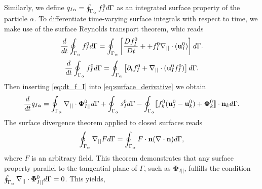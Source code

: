 Similarly, we define $q_{I\alpha} = \oint_{\Gamma_{\alpha}}  f_I^0 d\Gamma$ as an integrated surface property of the particle $\alpha$.
To differentiate time-varying surface integrals with respect to time, we make use of the surface Reynolds transport theorem, whic reads \citep{nadim1996concise} %
\begin{equation}
    \frac{d}{dt}  \oint_{\Gamma_{\alpha}} f_I^0  d\Gamma
    = \oint_{\Gamma_{\alpha}}  \left[
        \frac{D f_I^0}{Dt}+
        +   f_I^0\mathbf{\nabla}_{||} \cdot (\textbf{u}_I^0)
    \right] d\Gamma.
    \label{eq:surface_derivative}
\end{equation}
\begin{equation}
    \frac{d}{dt}  \oint_{\Gamma_{\alpha}} f_I^0  d\Gamma
    = \oint_{\Gamma_{\alpha}}  \left[
        \partial_t f_I^0
        +   \mathbf{\nabla}_{||} \cdot (\textbf{u}_I^0f_I^0)
    \right] d\Gamma.
    \label{eq:surface_derivative}
\end{equation}
Then inserting \ref{eq:dt_f_I} into \ref{eq:surface_derivative} we obtain
\begin{equation}
    \frac{d}{dt}  q_{I\alpha}
    = \oint_{\Gamma_{\alpha}}  
        \mathbf{\nabla}_{||} \cdot \boldsymbol{\Phi}_{I||}^0
     d\Gamma
    +\oint_{\Gamma_{\alpha}}  
        s_I^0
     d\Gamma
    - \oint_{\Gamma_{\alpha}} 
 \llbracket 
        f_k^0 (\textbf{u}_I^0 - \textbf{u}_k^0)
        + \mathbf{\Phi}_k^0
     \rrbracket \cdot \textbf{n}_k
     d\Gamma.
    \label{eq:dt_q_I_alpha}
\end{equation}
The surface divergence theorem applied to closed surfaces  reads \citep{nadim1996concise}
\begin{equation}
    \oint_{\Gamma_{\alpha}} \mathbf{\nabla}_{||} F d\Gamma
    = 
    \oint_{\Gamma_{\alpha}}  F \cdot\textbf{n} (\mathbf{\nabla}\cdot \textbf{n}) d\Gamma,
    \label{eq:gauss_surface}
\end{equation} 
where $F$ is an arbitrary field.
This theorem demonstrates that any surface property parallel to the tangential plane of $\Gamma$, such as $\bm\Phi_{I||}$, fulfills the condition $\oint_{\Gamma_{\alpha}} \mathbf{\nabla}_{||}\cdot \bm\Phi_{I||}^0 d\Gamma
= 0$.
This yields,%


